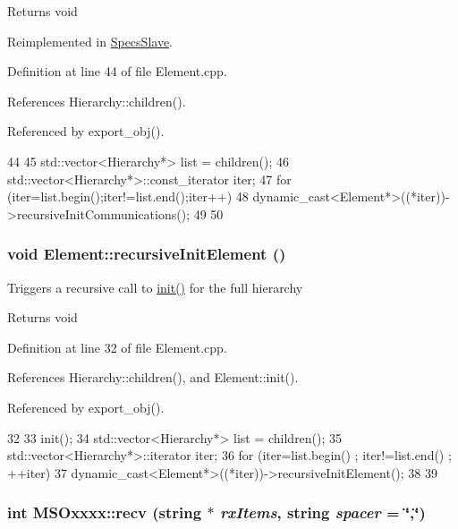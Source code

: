 \begin{DoxyReturn}{Returns}
void 
\end{DoxyReturn}


Reimplemented in \hyperlink{classSpecsSlave_a347b94c2ba660ccde6927fe72590a1bc}{SpecsSlave}.

Definition at line 44 of file Element.cpp.

References Hierarchy::children().

Referenced by export\_\-obj().


\begin{DoxyCode}
44                                          {
45   std::vector<Hierarchy*> list = children();
46   std::vector<Hierarchy*>::const_iterator iter;
47   for (iter=list.begin();iter!=list.end();iter++){
48     dynamic_cast<Element*>((*iter))->recursiveInitCommunications();
49   }
50 }
\end{DoxyCode}
\hypertarget{classElement_a3c0abcb36f8906688bb7e32608df7086}{
\subsubsection[{recursiveInitElement}]{\setlength{\rightskip}{0pt plus 5cm}void Element::recursiveInitElement ()}}
\label{classElement_a3c0abcb36f8906688bb7e32608df7086}
Triggers a recursive call to \hyperlink{classElement_af42754b5cabc198869222725218d695c}{init()} for the full hierarchy

\begin{DoxyReturn}{Returns}
void 
\end{DoxyReturn}


Definition at line 32 of file Element.cpp.

References Hierarchy::children(), and Element::init().

Referenced by export\_\-obj().


\begin{DoxyCode}
32                                   {
33   init();
34   std::vector<Hierarchy*> list = children();
35   std::vector<Hierarchy*>::iterator iter;
36   for (iter=list.begin() ; iter!=list.end() ; ++iter){
37     dynamic_cast<Element*>((*iter))->recursiveInitElement();
38   }
39 }
\end{DoxyCode}
\hypertarget{classMSOxxxx_aa02e46a61e287ef1f5377e9e42399faf}{
\subsubsection[{recv}]{\setlength{\rightskip}{0pt plus 5cm}int MSOxxxx::recv (string $\ast$ {\em rxItems}, \/  string {\em spacer} = {\ttfamily \char`\"{},\char`\"{}})}}
\label{classMSOxxxx_aa02e46a61e287ef1f5377e9e42399faf}


